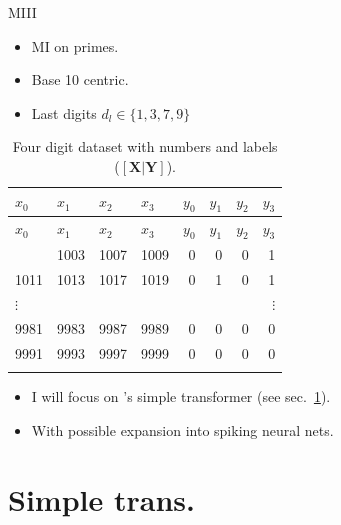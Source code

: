 \documentclass[aspectratio=32]{beamer}
\providecommand{\tightlist}{\setlength{\itemsep}{0pt}\setlength{\parskip}{0pt}}
\begin{document}
  \begin{frame}[allowframebreaks]{\textbar{} MIII}
  \begin{itemize}
  \tightlist
  \item
    MI on primes.
  \item
    Base 10 centric.
  \item
    Last digits \(d_l \in \{1,3,7,9\}\)
  \end{itemize}

  \framebreak

  \begin{longtable}[]{@{}llllrrrr@{}}
  \caption{Four digit dataset with numbers and labels
  (\([ \textbf{X} | \textbf{Y} ]\)).}\tabularnewline
  \toprule\noalign{}
  \(x_0\) & \(x_1\) & \(x_2\) & \(x_3\) & \(y_0\) & \(y_1\) & \(y_2\) &
  \(y_3\) \\
  \midrule\noalign{}
  \endfirsthead
  \toprule\noalign{}
  \(x_0\) & \(x_1\) & \(x_2\) & \(x_3\) & \(y_0\) & \(y_1\) & \(y_2\) &
  \(y_3\) \\
  \midrule\noalign{}
  \endhead
  1001 & 1003 & 1007 & 1009 & 0 & 0 & 0 & 1 \\
  1011 & 1013 & 1017 & 1019 & 0 & 1 & 0 & 1 \\
  \(\vdots\) & & & & & & & \(\vdots\) \\
  9981 & 9983 & 9987 & 9989 & 0 & 0 & 0 & 0 \\
  9991 & 9993 & 9997 & 9999 & 0 & 0 & 0 & 0 \\
  \bottomrule\noalign{}
  \end{longtable}

  \framebreak

  \begin{itemize}
  \tightlist
  \item
    I will focus on \textcite{he2023}'s simple transformer (see
    sec.~\ref{sec:simpletrans}).
  \item
    With possible expansion into spiking neural nets.
  \end{itemize}
  \end{frame}

  \section{\texorpdfstring{\textbar{} Simple trans.
  \autocite{he2023}}{\textbar{} Simple trans. {[}@he2023{]}}}\label{sec:simpletrans}
\end{document}
